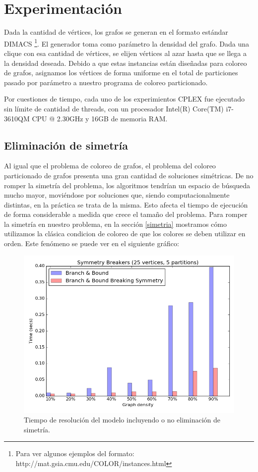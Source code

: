 \section{Experimentación}

Dada la cantidad de vértices, los grafos se generan en el formato estándar DIMACS \footnote{Para ver algunos ejemplos del formato: http://mat.gsia.cmu.edu/COLOR/instances.html}. El generador toma como parámetro la densidad del grafo. Dada una clique con esa cantidad de vértices, se elijen vértices al azar hasta que se llega a la densidad deseada. Debido a que estas instancias están diseñadas para coloreo de grafos, asignamos los vértices de forma uniforme en el total de particiones pasado por parámetro a nuestro programa de coloreo particionado.

Por cuestiones de tiempo, cada uno de los experimientos CPLEX fue ejecutado sin límite de cantidad de threads, con un procesador Intel(R) Core(TM) i7-3610QM CPU @ 2.30GHz y 16GB de memoria RAM.

\subsection{Eliminación de simetría}

Al igual que el problema de coloreo de grafos, el problema del coloreo particionado de grafos presenta una gran cantidad de soluciones simétricas. De no romper la simetría del problema, los algoritmos tendrían un espacio de búsqueda mucho mayor, moviéndose por soluciones que, siendo computacionalmente distintas, en la práctica se trata de la misma. Esto afecta el tiempo de ejecución de forma considerable a medida que crece el tamaño del problema. Para romper la simetría en nuestro problema, en la sección \ref{simetria} mostramos cómo utilizamos la clásica condicion de coloreo de que los colores se deben utilizar en orden. Este fenómeno se puede ver en el siguiente gráfico:

\begin{figure}[h]
\centering
\includegraphics[scale=0.7]{img/2-symmetry_v25_p5_l40_t1_b0.png}
\caption{Tiempo de resolución del modelo incluyendo o no eliminación de simetría.}
\end{figure}

